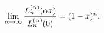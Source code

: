 \[\lim_{\alpha\to\infty}\frac{\mathop{L^{(\alpha)}_{n}\/}\nolimits\!\left(\alpha
x%
\right)}{\mathop{L^{(\alpha)}_{n}\/}\nolimits\!\left(0\right)}=(1-x)^{n}.\]